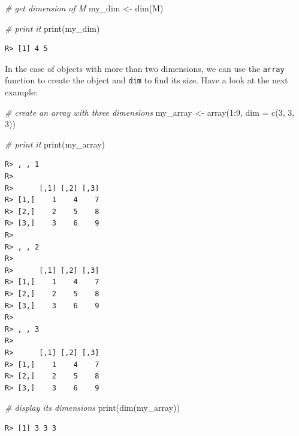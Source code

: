 \documentclass[
  12pt,
]{book}
\newenvironment{Shaded}{\begin{snugshade}}{\end{snugshade}}
\newcommand{\AttributeTok}[1]{\textcolor[rgb]{0.61,0.61,0.61}{#1}}
\newcommand{\CommentTok}[1]{\textcolor[rgb]{0.37,0.37,0.37}{\textit{#1}}}
\newcommand{\DecValTok}[1]{\textcolor[rgb]{0.06,0.06,0.06}{#1}}
\newcommand{\FunctionTok}[1]{\textcolor[rgb]{0,0,0}{#1}}
\newcommand{\NormalTok}[1]{#1}
\newcommand{\OtherTok}[1]{\textcolor[rgb]{0.37,0.37,0.37}{#1}}
\newcommand{\SpecialCharTok}[1]{\textcolor[rgb]{0,0,0}{#1}}
\begin{document}
\begin{Shaded}
\begin{Highlighting}[]
\CommentTok{\# get dimension of M}
\NormalTok{my\_dim }\OtherTok{\textless{}{-}} \FunctionTok{dim}\NormalTok{(M)}

\CommentTok{\# print it}
\FunctionTok{print}\NormalTok{(my\_dim)}
\end{Highlighting}
\end{Shaded}

\begin{verbatim}
R> [1] 4 5
\end{verbatim}

In the case of objects with more than two dimensions, we can use the \texttt{array} function to create the object and \texttt{dim} to find its size. Have a look at the next example:

\begin{Shaded}
\begin{Highlighting}[]
\CommentTok{\# create an array with three dimensions}
\NormalTok{my\_array }\OtherTok{\textless{}{-}} \FunctionTok{array}\NormalTok{(}\DecValTok{1}\SpecialCharTok{:}\DecValTok{9}\NormalTok{, }\AttributeTok{dim =} \FunctionTok{c}\NormalTok{(}\DecValTok{3}\NormalTok{, }\DecValTok{3}\NormalTok{, }\DecValTok{3}\NormalTok{))}

\CommentTok{\# print it}
\FunctionTok{print}\NormalTok{(my\_array)}
\end{Highlighting}
\end{Shaded}

\begin{verbatim}
R> , , 1
R> 
R>      [,1] [,2] [,3]
R> [1,]    1    4    7
R> [2,]    2    5    8
R> [3,]    3    6    9
R> 
R> , , 2
R> 
R>      [,1] [,2] [,3]
R> [1,]    1    4    7
R> [2,]    2    5    8
R> [3,]    3    6    9
R> 
R> , , 3
R> 
R>      [,1] [,2] [,3]
R> [1,]    1    4    7
R> [2,]    2    5    8
R> [3,]    3    6    9
\end{verbatim}

\begin{Shaded}
\begin{Highlighting}[]
\CommentTok{\# display its dimensions}
\FunctionTok{print}\NormalTok{(}\FunctionTok{dim}\NormalTok{(my\_array))}
\end{Highlighting}
\end{Shaded}

\begin{verbatim}
R> [1] 3 3 3
\end{verbatim}
\end{document}
